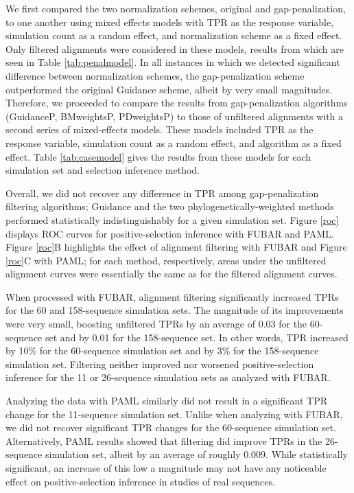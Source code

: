 \documentclass[10pt]{article}
\begin{document}
We first compared the two normalization schemes, original and gap-penalization, to one another using mixed effects models with TPR as the response variable, simulation count as a random effect, and normalization scheme as a fixed effect. Only filtered alignments were considered in these models, results from which are seen in Table \ref{tab:penalmodel}. In all instances in which we detected significant difference between normalization schemes, the gap-penalization scheme outperformed the original Guidance scheme, albeit by very small magnitudes. Therefore, we proceeded to compare the results from gap-penalization algorithms (GuidanceP, BMweightsP, PDweightsP) to those of unfiltered alignments with a second series of mixed-effects models. These models included TPR as the response variable, simulation count as a random effect, and algorithm as a fixed effect. Table \ref{tab:casemodel} gives the results from these models for each simulation set and selection inference method.

Overall, we did not recover any difference in TPR among gap-penalization filtering algorithms; Guidance and the two phylogenetically-weighted methods performed statistically indistinguishably for a given simulation set. Figure \ref{roc} displays ROC curves for positive-selection inference with FUBAR and PAML. Figure \ref{roc}B highlights the effect of alignment filtering with FUBAR and Figure \ref{roc}C with PAML; for each method, respectively, areas under the unfiltered alignment curves were essentially the same as for the filtered alignment curves.

When processed with FUBAR, alignment filtering significantly increased TPRs for the 60 and 158-sequence simulation sets. The magnitude of its improvements were very small, boosting unfiltered TPRs by an average of 0.03 for the 60-sequence set and by 0.01 for the 158-sequence set. In other words, TPR increased by 10\% for the 60-sequence simulation set and by 3\% for the 158-sequence simulation set. Filtering neither improved nor worsened positive-selection inference for the 11 or 26-sequence simulation sets as analyzed with FUBAR.

Analyzing the data with PAML similarly did not result in a significant TPR change for the 11-sequence simulation set. Unlike when analyzing with FUBAR, we did not recover significant TPR changes for the 60-sequence simulation set. Alternatively, PAML results showed that filtering did improve TPRs in the 26-sequence simulation set, albeit by an average of roughly 0.009. While statistically significant, an increase of this low a magnitude may not have any noticeable effect on positive-selection inference in studies of real sequences. 
\end{document}
